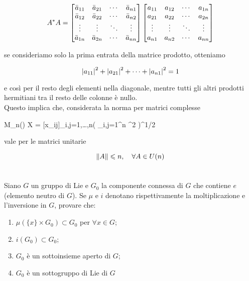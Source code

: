 \begin{equation}
	A^{*} A = %
	\bmqty{ %
		\bar{a}_{11} & \bar{a}_{21} & \cdots & \bar{a}_{n1} \\ %
		\bar{a}_{12} & \bar{a}_{22} & \cdots & \bar{a}_{n2} \\ %
		\vdots & \vdots & \ddots & \vdots \\ %
		\bar{a}_{1n} & \bar{a}_{2n} & \cdots & \bar{a}_{nn}
	}
	\bmqty{ %
		a_{11} & a_{12} & \cdots & a_{1n} \\ %
		a_{21} & a_{22} & \cdots& a_{2n} \\ %
		\vdots & \vdots & \ddots & \vdots \\ %
		a_{n1} & a_{n2} & \cdots & a_{nn}
	}
\end{equation}

se consideriamo solo la prima entrata della matrice prodotto, otteniamo

\begin{equation}
	\abs{a_{11}}^{2} + \abs{a_{21}}^{2} + \cdots + \abs{a_{n1}}^{2} = 1
\end{equation}

e così per il resto degli elementi nella diagonale, mentre tutti gli altri prodotti hermitiani tra il resto delle colonne è nullo.\\
Questo implica che, considerata la norma per matrici complesse

\map{\norm{}}
	{M_{n}(\C)}{\R}
	{X = [x_{ij}]_{i,j=1,\dots,n}}{\left( \sum_{i,j=1}^{n} ^{2} \right)^{1/2}}

vale per le matrici unitarie

\begin{equation}
	\norm{A} \leqslant n \qcomma \forall A \in U(n)
\end{equation}

%

\newpage

%

\section{}\label{es3-6}

\begin{tcolorbox}
	Siano $ G $ un gruppo di Lie e $ G_{0} $ la componente connessa di $ G $ che contiene $ e $ (elemento neutro di $ G $). Se $ \mu $ e $ i $ denotano rispettivamente la moltiplicazione e l'inversione in $ G $, provare che:
	
	\begin{enumerate}
		\item $ \mu(\{x\} \times G_{0}) \subset G_{0} $ per $ \forall x \in G $;
		
		\item $ i(G_{0}) \subset G_{0} $;
		
		\item $ G_{0} $ è un sottoinsieme aperto di $ G $;
		
		\item $ G_{0} $ è un sottogruppo di Lie di $ G $
	\end{enumerate}
\end{tcolorbox}

